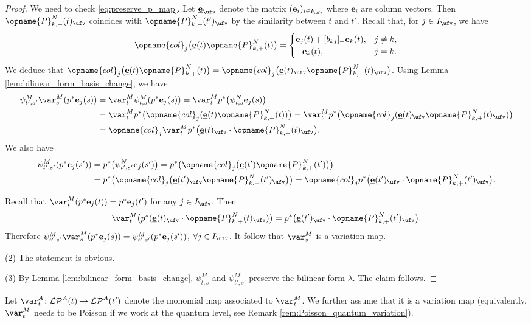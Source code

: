 \documentclass[pdftex]{sigma}
\newcommand{\Iufv}{I_{\ufv}}
\newcommand{\LP}{{\mathcal{LP}}}
\newcommand{\col}{\opname{col}}
\newcommand{\trans}{\opname{P}}
\newcommand{\ee}{\mathbf{e}}
\newcommand{\uee}{\underline{\ee}}
\numberwithin{equation}{section}
\begin{document}
\begin{proof}
We need to check \eqref{eq:preserve_p_map}. Let $\uee_{\ufv}$ denote
the matrix $(\ee_{i})_{i\in\Iufv}$ where $\ee_{i}$ are column vectors.
Then $\trans_{k,+}^{N}(t)_{\ufv}$ coincides with $\trans_{k,+}^{N}(t')_{\ufv}$
by the similarity between $t$ and $t'$. Recall that, for $j\in I_{\ufv}$, we have \[\col_{j}\big(\uee(t)\trans_{k,+}^{N}(t)\big)=\begin{cases}
 \ee_j(t)+[b_{kj}]_+\ee_k(t), & j\neq k,\\
 -\ee_k(t), & j=k.
\end{cases}\]
We deduce that $\col_{j}\big(\uee(t)\trans_{k,+}^{N}(t)\big)=\col_{j}\big(\uee(t)_{\ufv}\trans_{k,+}^{N}(t)_{\ufv}\big)$. Using Lemma \ref{lem:bilinear_form_basis_change},
we have
\begin{align*}
\psi_{t',s'}^{M}\var_{s}^{M}(p^{*}\ee_{j}(s)) & =\var_{t}^{M}\psi_{t,s}^{M}(p^{*}\ee_{j}(s))=\var_{t}^{M}p^{*}\big(\psi_{t,s}^{N}\ee_{j}(s)\big)\\
 & =\var_{t}^{M}p^{*}\bigl(\col_{j}(\uee(t)\trans_{k,+}^{N}(t))\bigr)=\var_{t}^{M}p^{*}\bigl(\col_{j}(\uee(t)_{\ufv}\trans_{k,+}^{N}(t)_{\ufv})\bigr)\\
 & =\col_{j}\var_{t}^{M}p^{*}\big(\uee(t)_{\ufv}\cdot\trans_{k,+}^{N}(t)_{\ufv}\big).
\end{align*}
We also have
\begin{align*}
\psi_{t',s'}^{M}(p^{*}\ee_{j}(s')) & =p^{*}\big(\psi_{t',s'}^{N}\ee_{j}(s')\big)=p^{*}\bigl(\col_{j}\big(\uee(t')\trans_{k,+}^{N}(t')\big)\bigr)\\
 & =p^{*}\bigl(\col_{j}\big(\uee(t')_{\ufv}\trans_{k,+}^{N}(t')_{\ufv}\big)\bigr) =\col_{j}p^{*}\big(\uee(t')_{\ufv}\cdot\trans_{k,+}^{N}(t')_{\ufv}\big).
\end{align*}

Recall that $\var_{t}^{M}(p^{*}\ee_{j}(t))=p^{*}\ee_{j}(t')$ for
any $j\in I_{\ufv}$. Then
\[\var_{t}^{M}\big(p^{*}(\uee(t)_{\ufv}\cdot\trans_{k,+}^{N}(t)_{\ufv})\big)=p^{*}\big(\uee(t')_{\ufv}\cdot\trans_{k,+}^{N}(t')_{\ufv}\big).\]
Therefore $\psi_{t',s'}^{M}\var_{s}^{M}(p^{*}\ee_{j}(s))=\psi_{t',s'}^{M}(p^{*}\ee_{j}(s'))$,
$\forall j\in I_{\ufv}$. It follow that $\var_{s}^{M}$ is a variation
map.

(2) The statement is obvious.

(3) By Lemma \ref{lem:bilinear_form_basis_change}, $\psi_{t,s}^{M}$
and $\psi_{t',s'}^{M}$ preserve the bilinear form $\lambda$. The
claim follows.
\end{proof}

Let $\var_{t}^{A}\colon\LP^{A}(t)\rightarrow \LP^{A}(t')$ denote the monomial map associated to $\var_{t}^{M}$. We further assume that it is a variation map (equivalently, $\var_t^M$ needs to be Poisson if we work at the quantum level, see Remark \ref{rem:Poisson_quantum_variation}).
\end{document}
